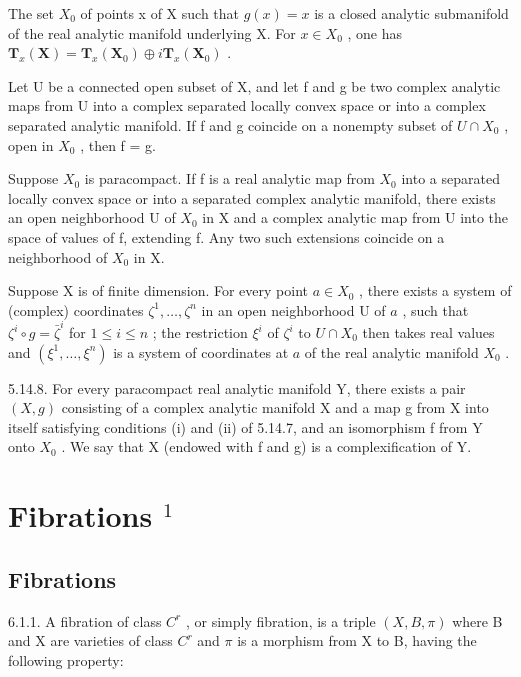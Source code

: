 The set \(X_{0}\) of points x of X such that \(g(x) = x\) is a closed analytic submanifold of the real analytic manifold underlying X. For \(x \in X_{0}\) , one has \(\mathbf{T}_{x}(\mathbf{X}) = \mathbf{T}_{x}(\mathbf{X}_{0}) \oplus i\mathbf{T}_{x}(\mathbf{X}_{0})\) .

Let U be a connected open subset of X, and let f and g be two complex analytic maps from U into a complex separated locally convex space or into a complex separated analytic manifold. If f and g coincide on a nonempty subset of \(U \cap X_{0}\) , open in \(X_{0}\) , then f = g.

Suppose \(X_{0}\) is paracompact. If f is a real analytic map from \(X_{0}\) into a separated locally convex space or into a separated complex analytic manifold, there exists an open neighborhood U of \(X_{0}\) in X and a complex analytic map from U into the space of values of f, extending f. Any two such extensions coincide on a neighborhood of \(X_{0}\) in X.

Suppose X is of finite dimension. For every point \(a \in X_{0}\) , there exists a system of (complex) coordinates \(\zeta^{1}, \ldots, \zeta^{n}\) in an open neighborhood U of \(a\) , such that \(\zeta^{i} \circ g = \bar{\zeta}^{i}\) for \(1 \leqslant i \leqslant n\) ; the restriction \(\xi^{i}\) of \(\zeta^{i}\) to \(U \cap X_{0}\) then takes real values and \((\xi^{1}, \ldots, \xi^{n})\) is a system of coordinates at \(a\) of the real analytic manifold \(X_{0}\) .

5.14.8. For every paracompact real analytic manifold Y, there exists a pair \((X, g)\) consisting of a complex analytic manifold X and a map g from X into itself satisfying conditions (i) and (ii) of 5.14.7, and an isomorphism f from Y onto \(X_{0}\) . We say that X (endowed with f and g) is a complexification of Y.

\section{\texorpdfstring{Fibrations \(^{1}\)}{Fibrations ¹}}

\subsection{Fibrations}

6.1.1. A fibration of class \(C^{r}\) , or simply fibration, is a triple \((X, B, \pi)\) where B and X are varieties of class \(C^{r}\) and \(\pi\) is a morphism from X to B, having the following property:

